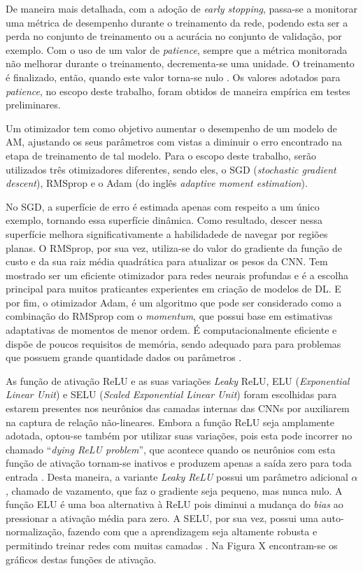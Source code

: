 De maneira mais detalhada, com a adoção de \emph{early stopping}, passa-se a monitorar uma métrica de desempenho durante o treinamento da rede, podendo esta ser a perda no conjunto de treinamento ou a acurácia no conjunto de validação, por exemplo. Com o uso de um valor de \emph{patience}, sempre que a métrica monitorada não melhorar durante o treinamento, decrementa-se uma unidade. O treinamento é finalizado, então, quando este valor torna-se nulo \cite{chollet}. Os valores adotados para \emph{patience}, no escopo deste trabalho, foram obtidos de maneira empírica em testes preliminares.

Um otimizador tem como objetivo aumentar o desempenho de um modelo de AM, ajustando os seus parâmetros com vistas a diminuir o erro encontrado na etapa de treinamento de tal modelo. Para o escopo deste trabalho, serão utilizados três otimizadores diferentes, sendo eles, o SGD (\emph{stochastic gradient descent}), RMSprop e o Adam (do inglês \emph{adaptive moment estimation}).

No SGD, a superfície de erro é estimada apenas com respeito a um único exemplo, tornando essa superfície dinâmica. Como resultado, descer nessa superfície melhora significativamente a habilidadede de navegar por regiões planas. O RMSprop, por sua vez, utiliza-se do valor do gradiente da função de custo e da sua raiz média quadrática para atualizar os pesos da CNN. Tem mostrado ser um eficiente otimizador para redes neurais profundas e é a escolha principal para muitos praticantes experientes em criação de modelos de DL. E por fim, o otimizador Adam, é um algoritmo que pode ser considerado como a combinação do RMSprop com o \emph{momentum}, que possui base em estimativas adaptativas de momentos de menor ordem. É computacionalmente eficiente e dispõe de poucos requisitos de memória, sendo adequado para para problemas que possuem grande quantidade dados ou parâmetros \cite{buduma, rmsprop, adam}.

As função de ativação ReLU e as suas variações \emph{Leaky} ReLU, ELU (\emph{Exponential Linear Unit}) e SELU (\emph{Scaled Exponential Linear Unit}) foram escolhidas para estarem presentes nos neurônios das camadas internas das CNNs por auxiliarem na captura de relação não-lineares. Embora a função ReLU seja amplamente adotada, optou-se também por utilizar suas variações, pois esta pode incorrer no chamado ``\emph{dying ReLU problem}'', que acontece quando os neurônios com esta função de ativação tornam-se inativos e produzem apenas a saída zero para toda entrada \cite{reluDying}.  Desta maneira, a variante \emph{Leaky ReLU} possui um parâmetro adicional $\alpha$, chamado de vazamento, que faz o gradiente seja pequeno, mas nunca nulo. A função ELU é uma boa alternativa à ReLU pois diminui a mudança do \emph{bias} ao pressionar a ativação média para zero. A SELU, por sua vez, possui uma auto-normalização, fazendo com que a aprendizagem seja altamente robusta e permitindo treinar redes com muitas camadas \cite{relu}. Na Figura X encontram-se os gráficos destas funções de ativação.

